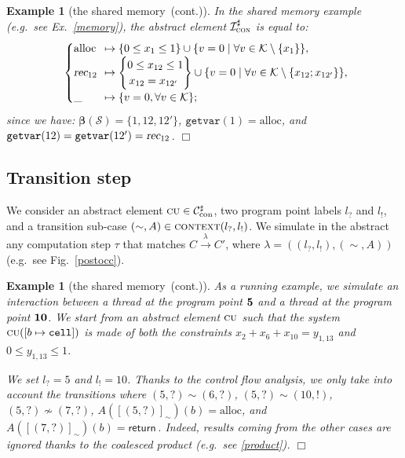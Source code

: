 \documentclass{article}
\newcommand{\boxexample}{$\Box$}
\newtheorem{example}[thm]{Example}
\newcommand{\rec}{?}
\newcommand{\eme}{!}
\newcommand{\pp}[1]{$\bf{#1}$}
\newcommand{\globalname}[1]{\mathrm{#1}}
\newcommand{\internal}[1]{\textnormal{\texttt{#1}}}
\newcommand{\data}[1]{\textsf{#1}\,}
\newcommand{\recur}[1]{{\textsl{#1}}}
\newcommand{\addread}{\data{return}}
\newcommand{\cbang}{\recur{rec}}
\newcommand{\ccreate}{\globalname{alloc}}
\newcommand{\ccell}{\internal{cell}}
\newcommand{\memlaba}{1}
\newcommand{\memlabb}{2}
\newcommand{\memlabe}{5}
\newcommand{\memlabf}{6}
\newcommand{\memlabg}{7}
\newcommand{\memlabj}{10}
\newcommand{\memlabl}{12}
\newcommand{\memlabm}{13}
\newcommand{\System}{\mathcal{S}}
\newcommand{\Extract}{\mathbf{\beta}}
\newcommand{\nonstan}[1]{\overset{\scriptscriptstyle{#1}}{\scriptstyle \longrightarrow}}
\newcommand{\lrec}{l_{\rec}}
\newcommand{\leme}{l_{\eme}}
\newcommand{\continued}{(cont.)}
\newcommand{\giveindex}{\texttt{getvar}}
\newcommand{\adom}[1]{\mathcal{C}_{#1}^{\sharp}}
\newcommand{\ainit}[1]{\mathcal{I}_{#1}^{\sharp}}
\newcommand{\shareanalysis}{the shared memory}
\newcommand{\tp}{\textsc{cu}}
\newcommand{\var}{\mathcal{K}}
\newcommand{\numkey}{\textsc{con}}
\newcommand{\initnum}{\ainit{\numkey}}
\newcommand{\Numkey}{\text{con}}
\newcommand{\Numdom}{\adom{\Numkey}}
\newcommand{\ccontentanalysis}{\shareanalysis\ \continued}
\begin{document}
\begin{example}[\ccontentanalysis]
In the shared memory example (e.g.~see Ex.~\ref{memory}), the abstract element $\initnum$ is equal to:
\begin{equation*}
\begin{cases}
\ccreate & \!\!\mapsto \{0\leq x_{\memlaba}\leq 1\}\cup \{v = 0 \;|\;\forall v\in \var\setminus\{x_{\memlaba}\}\},\cr
\cbang_{12} & \!\!\mapsto \left\{\begin{array}{c}\!\!\!
0\leq x_{\memlabl}\leq 1\!\!\!\cr
\!\!\!x_{\memlabl}=x_{\memlabl'}\!\end{array}\right\}\cup \{v = 0 \;|\;\forall v\in \var\setminus\{x_{{\memlabl}};x_{\memlabl'}\}\},\!\!\!\cr
\_ & \!\!\mapsto \{v=0, \forall v\in \var\};\cr
 \end{cases}
\end{equation*}
since we have: $\Extract(\System)=\{1,12,12'\}$, $\giveindex(1)=\ccreate$, and $\giveindex(12)=\giveindex(12')=\cbang_{12}$.
\boxexample\end{example}

\subsection{Transition step}
We consider an abstract element $\tp\in\Numdom$, two program point labels $\lrec$ and $\leme$, and a transition sub-case $(\sim,A)\in\abstractcontext(\lrec,\leme)$. We simulate in the abstract any computation step $\tau$ that matches $C \nonstan{\lambda} C'$, where $\lambda=((\lrec,\leme),(\sim,A))$ (e.g.~see Fig.~\ref{postocc}).

\begin{example}[\ccontentanalysis]
As a running example, we simulate an interaction between a thread at the program point \pp{\memlabe} and 
a thread at the program point \pp{\memlabj}. 
We start from an abstract element $\tp$ such that
the system $\tp([b\mapsto \ccell])$ is made of both the constraints $x_{\memlabb} + x_{\memlabf} + x_{\memlabj} = y_{\memlaba,\memlabm}$ and $0\leq y_{\memlaba,\memlabm} \leq 1$.

We set $\lrec=\memlabe$ and $\leme=\memlabj$.
Thanks to the control flow analysis, we only take into account the transitions where $(\memlabe,\rec)\sim(\memlabf,\rec)$, $(\memlabe,\rec)\sim(\memlabj,\eme)$, $(\memlabe,\rec)\not \sim (\memlabg,\rec)$, $A([(\memlabe,\rec)]_\sim)(b)=\ccreate$, and $A([(\memlabg,\rec)]_\sim)(b)=\addread$. Indeed, results coming from the other cases are ignored thanks to the coalesced product (e.g.~see \ref{product}). 
\boxexample\end{example}
\end{document}
